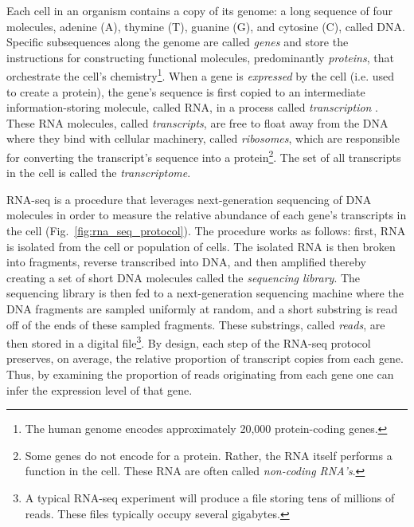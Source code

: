 Each cell in an organism contains a copy of its genome: a long sequence of four molecules, adenine (A), thymine (T), guanine (G), and cytosine (C), called DNA.  Specific subsequences along the genome are called \textit{genes} and store the instructions for constructing functional molecules, predominantly \textit{proteins}, that orchestrate the cell's chemistry\footnote{The human genome encodes approximately 20,000 protein-coding genes.}. When a gene is \textit{expressed} by the cell (i.e. used to create a protein), the gene's sequence is first copied to an intermediate information-storing molecule, called RNA, in a process called \textit{transcription} . These RNA molecules, called \textit{transcripts}, are free to float away from the DNA where they bind with cellular machinery, called \textit{ribosomes}, which are responsible for converting the transcript's sequence into a protein\footnote{Some genes do not encode for a protein. Rather, the RNA itself performs a function in the cell. These RNA are often called \textit{non-coding RNA's}.}.  The set of all transcripts in the cell is called the \textit{transcriptome}.

RNA-seq is a procedure that leverages next-generation sequencing of DNA molecules in order to measure the relative abundance of each gene's transcripts in the cell (Fig.~\ref{fig:rna_seq_protocol}). The procedure works as follows: first, RNA is isolated from the cell or population of cells. The isolated RNA is then broken into fragments, reverse transcribed into DNA, and then amplified thereby creating a set of short DNA molecules called the \textit{sequencing library}. The sequencing library is then fed to a next-generation sequencing machine where the DNA fragments are sampled uniformly at random, and a short substring is read off of the ends of these sampled fragments.  These substrings, called \textit{reads}, are then stored in a digital file\footnote{A typical RNA-seq experiment will produce a file storing tens of millions of reads. These files typically occupy several gigabytes.}.  By design, each step of the RNA-seq protocol preserves, on average, the relative proportion of transcript copies from each gene. Thus, by examining the proportion of reads originating from each gene one can infer the expression level of that gene.  

